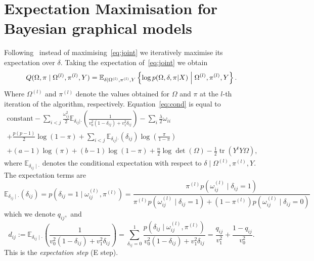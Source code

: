 \documentclass[a4paper, 11pt, oneside]{report}
\DeclareMathOperator{\tr}{tr}
\newcommand{\E}{\mathbb{E}}
\newcommand{\1}{\mathds{1}}
\newcommand{\powl}{^{(l)}}
\begin{document}
\section{Expectation Maximisation for Bayesian graphical models}
Following~\cite{limcco-2017} instead of maximising~\eqref{eq:joint} we
iteratively maximise its expectation over $\delta$. Taking the expectation
of~\eqref{eq:joint} we obtain
\begin{equation}\label{eq:cond}
	Q(\Omega, \pi \mid \Omega\powl, \pi\powl, Y) = \mathbb{E}_{\delta \mid \Omega\powl, \pi\powl, Y}\left\{\log p(\Omega, \delta, \pi| X) \Bigm\vert  \Omega\powl, \pi\powl, Y\right\}.
\end{equation}
Where $\Omega\powl$ and $\pi\powl$ denote the values obtained for $\Omega$ and
$\pi$ at the $l$-th iteration of the algorithm, respectively.
Equation~\eqref{eq:cond} is equal to
\begin{multline}
	\text{constant} - \sum_{i<j} \frac{\omega_{ij}^2}{2} \E_{\delta_{ij} |
		\cdot}\left(\frac{1}{v_0^2 (1 - \delta_{ij}) + v_1^2 \delta_{ij}}\right) -
	\sum_i \frac{\lambda}{2} \omega_{ii}
	\\
	+ \frac{p(p-1)}{2}  \log(1 - \pi) + \sum_{i<j} \E_{\delta_{ij} |
		\cdot}(\delta_{ij}) \log\left(\frac{\pi}{1-\pi}\right)
	\\
	+ (a - 1) \log(\pi) + (b - 1) \log(1 - \pi)
	+ \frac{n}{2} \log\det(\Omega) - \frac{1}{2} \tr(Y^t Y \Omega),
\end{multline}
where $\mathbb{E}_{\delta_{ij} \mid \cdot}$ denotes the conditional expectation with respect
to $\delta \mid \Omega\powl, \pi\powl, Y.$
The expectation terms are
\begin{equation}\label{eq:qij}
	\E_{\delta_{ij} \mid \cdot}(\delta_{ij}) = p\left(\delta_{ij} = 1 \mid \omega_{ij}\powl, \pi\powl\right)
	= \frac{ \pi\powl p\left(\omega_{ij}\powl \mid \delta_{ij} = 1\right)}{\pi\powl p\left(\omega_{ij}\powl \mid \delta_{ij} = 1\right) +
		(1 - \pi\powl) p\left(\omega_{ij}\powl \mid \delta_{ij} = 0\right)}
\end{equation}
which we denote $q_{ij},$ and
\begin{equation}\label{eq:dij}
	d_{ij} := \E_{\delta_{ij} \mid \cdot}\left(\frac{1}{v_0^2 (1 -
			\delta_{ij}) + v_1^2 \delta_{ij}}\right) = \sum_{\delta_{ij} = 0}^1
	\frac{p\left(\delta_{ij} \mid \omega_{ij}\powl, \pi\powl\right)}{v_0^2 (1 - \delta_{ij}) +
		v_1^2 \delta_{ij}} = \frac{q_{ij}}{v_1^2} + \frac{1 - q_{ij}}{v_0^2}.
\end{equation}
This is the \emph{expectation step} (E step).
\end{document}
